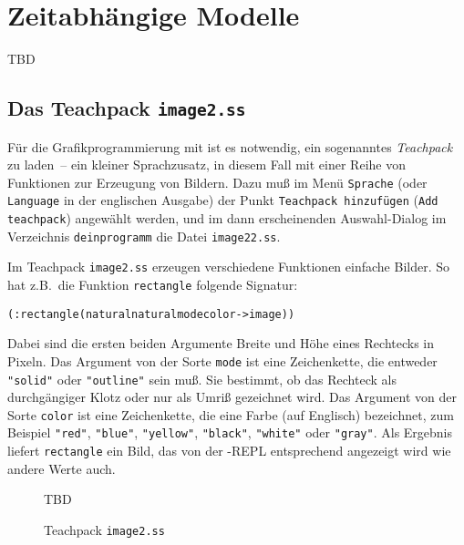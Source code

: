 
\chapter{Zeitabhängige Modelle}
\label{cha:representation-and-state}

TBD

\section{Das Teachpack \texttt{image2.ss}}

Für die Grafikprogrammierung mit \drscheme{} ist es notwendig, ein
sogenanntes \textit{Teachpack} zu laden~-- ein
kleiner Sprachzusatz, in diesem Fall mit einer Reihe von Funktionen zur Erzeugung von
Bildern.  Dazu muß im Menü \texttt{Sprache} (oder \texttt{Language} in
der englischen Ausgabe) der Punkt \texttt{Teachpack hinzufügen}
(\texttt{Add teachpack}) angewählt werden, und im dann erscheinenden
Auswahl-Dialog im Verzeichnis \texttt{deinprogramm} die Datei
\texttt{image22.ss}.

Im Teachpack \texttt{image2.ss} erzeugen verschiedene Funktionen
einfache Bilder.  So hat z.B.\ die Funktion \texttt{rectangle}
folgende Signatur:
%
\begin{alltt}
(: rectangle (natural natural mode color -> image))
\end{alltt}
%
Dabei sind die ersten beiden Argumente Breite und Höhe eines Rechtecks
in Pixeln.
Das Argument von der Sorte \texttt{mode} ist eine Zeichenkette, die
entweder \verb|"solid"| oder \verb|"outline"| sein muß. Sie bestimmt,
ob das Rechteck als durchgängiger Klotz oder nur als Umriß gezeichnet
wird.  Das Argument von der Sorte \texttt{color} ist eine
Zeichenkette, die eine Farbe (auf Englisch) bezeichnet, 
zum Beispiel \verb|"red"|, \verb|"blue"|, \verb|"yellow"|,
\verb|"black"|, \verb|"white"| oder \verb|"gray"|.  Als Ergebnis
liefert \texttt{rectangle} ein Bild, das von der \drscheme{}-REPL
entsprechend angezeigt wird wie andere Werte auch.

\begin{figure}[tb!]
  \centering
  TBD
  \caption{Teachpack \texttt{image2.ss}}
  \label{fig:image-ss}
\end{figure}

